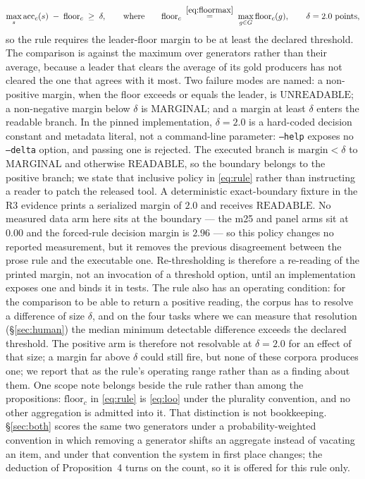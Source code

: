 \documentclass{article}
\begin{document}
\begin{equation}
\max_s \mathrm{acc}_{c}(s) \;-\; \mathrm{floor}_c \;\ge\; \delta,
\qquad\text{where}\qquad
\mathrm{floor}_c \;\overset{\eqref{eq:floormax}}{=}\; \max_{g \in G} \mathrm{floor}_c(g),
\qquad \delta = 2.0\ \text{points},
\label{eq:rule}
\end{equation} so the rule requires the leader-floor margin to be at least the declared threshold. The comparison is against the maximum over generators rather than their average, because a leader that clears the average of its gold producers has not cleared the one that agrees with it most. Two failure modes are named: a non-positive margin, when the floor exceeds or equals the leader, is $\mathrm{UNREADABLE}$; a non-negative margin below $\delta$ is $\mathrm{MARGINAL}$; and a margin at least $\delta$ enters the readable branch. In the pinned implementation, $\delta=2.0$ is a hard-coded decision constant and metadata literal, not a command-line parameter: \texttt{--help} exposes no \texttt{--delta} option, and passing one is rejected. The executed branch is $\mathrm{margin}<\delta$ to $\mathrm{MARGINAL}$ and otherwise $\mathrm{READABLE}$, so the boundary belongs to the positive branch; we state that inclusive policy in \eqref{eq:rule} rather than instructing a reader to patch the released tool. A deterministic exact-boundary fixture in the R3 evidence prints a serialized margin of $2.0$ and receives $\mathrm{READABLE}$. No measured data arm here sits at the boundary --- the m25 and panel arms sit at $0.00$ and the forced-rule decision margin is $2.96$ --- so this policy changes no reported measurement, but it removes the previous disagreement between the prose rule and the executable one. Re-thresholding is therefore a re-reading of the printed margin, not an invocation of a threshold option, until an implementation exposes one and binds it in tests. The rule also has an operating condition: for the comparison to be able to return a positive reading, the corpus has to resolve a difference of size $\delta$, and on the four tasks where we can measure that resolution (\S\ref{sec:human}) the median minimum detectable difference exceeds the declared threshold. The positive arm is therefore not resolvable at $\delta = 2.0$ for an effect of that size; a margin far above $\delta$ could still fire, but none of these corpora produces one; we report that as the rule's operating range rather than as a finding about them. One scope note belongs beside the rule rather than among the propositions: $\mathrm{floor}_c$ in \eqref{eq:rule} is \eqref{eq:loo} under the plurality convention, and no other aggregation is admitted into it. That distinction is not bookkeeping. \S\ref{sec:both} scores the same two generators under a probability-weighted convention in which removing a generator shifts an aggregate instead of vacating an item, and under that convention the system in first place changes; the deduction of Proposition~4 turns on the count, so it is offered for this rule only.
\end{document}

